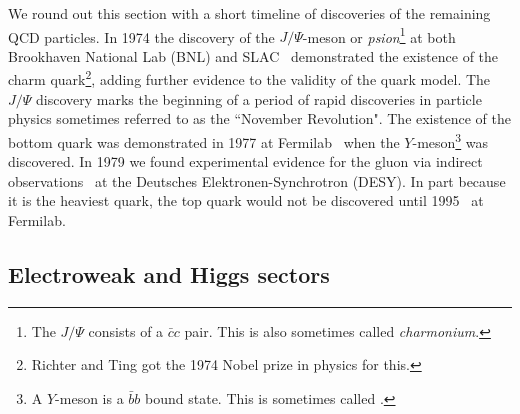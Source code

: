 We round out this section with a short timeline of discoveries of the
remaining QCD particles. In 1974 the discovery of the 
$J/\Psi$-meson or {\it psion}\footnote{The $J/\Psi$ consists
of a $\bar{c}c$ pair. This is also sometimes called {\it charmonium}.
} at both Brookhaven National Lab (BNL) and
SLAC~\cite{augustin_discovery_1974,aubert_experimental_1974} demonstrated
the existence of the charm quark\footnote{Richter and Ting got the 1974
Nobel prize in physics for this.}, adding further evidence to
the validity of the quark model. The $J/\Psi$ discovery marks the beginning of a
period of rapid discoveries in particle physics sometimes referred to as the
``November Revolution". The existence of the bottom
quark was demonstrated in 1977 at Fermilab~\cite{herb_observation_1977} when the 
$Y$-meson\footnote{A $Y$-meson is a $\bar{b}b$ bound state. This is
sometimes called .} was discovered.
In 1979 we found experimental evidence for the
gluon via indirect observations~\cite{barber_discovery_1979} at the
Deutsches Elektronen-Synchrotron (DESY). In part because it is the
heaviest quark, the top quark would not be discovered until
1995~\cite{abachi_observation_1995,abe_observation_1995}
at Fermilab.

\subsection{Electroweak and Higgs sectors}

